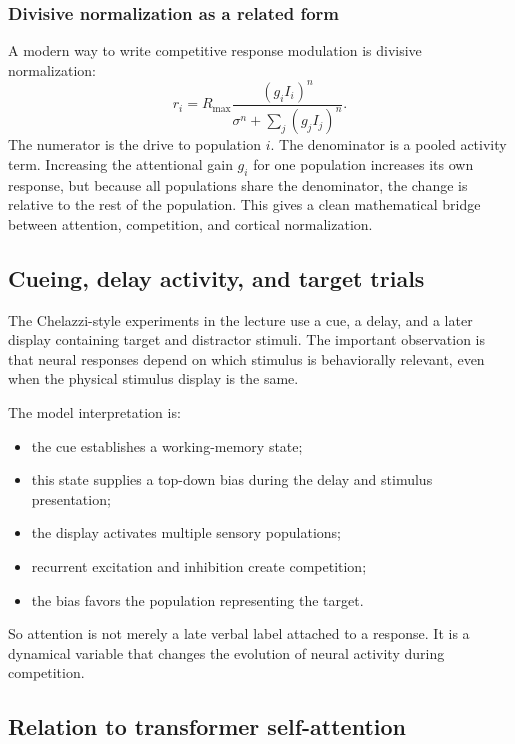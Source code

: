 \clearpage

\subsubsection{Divisive normalization as a related form}

A modern way to write competitive response modulation is divisive normalization:
\[
r_i
=
R_{\max}
\frac{(g_i I_i)^n}
{\sigma^n+\sum_j(g_j I_j)^n}.
\]
The numerator is the drive to population \(i\). The denominator is a pooled activity term. Increasing the attentional gain \(g_i\) for one population increases its own response, but because all populations share the denominator, the change is relative to the rest of the population. This gives a clean mathematical bridge between attention, competition, and cortical normalization.

\subsection{Cueing, delay activity, and target trials}

The Chelazzi-style experiments in the lecture use a cue, a delay, and a later display containing target and distractor stimuli. The important observation is that neural responses depend on which stimulus is behaviorally relevant, even when the physical stimulus display is the same.

The model interpretation is:
\begin{itemize}
    \item the cue establishes a working-memory state;
    \item this state supplies a top-down bias during the delay and stimulus presentation;
    \item the display activates multiple sensory populations;
    \item recurrent excitation and inhibition create competition;
    \item the bias favors the population representing the target.
\end{itemize}

So attention is not merely a late verbal label attached to a response. It is a dynamical variable that changes the evolution of neural activity during competition.

\subsection{Relation to transformer self-attention}

